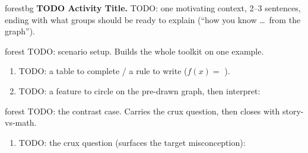 \documentclass[12pt]{article}
\newcommand{\answerspace}[2]{\par\nopagebreak\noindent\begin{minipage}[t][#1][t]{\linewidth}%
  \color{keyred}\bfseries #2\end{minipage}\par}
\begin{document}

\vspace{0.06in}

\begin{headlinebox}{forestbg}
\textbf{TODO Activity Title.} TODO: one motivating context, 2--3 sentences, ending with what
groups should be ready to explain (``how you know \dots\ from the graph'').
\end{headlinebox}

\vspace{0.04in}

\begin{scenariobox}{forest}
TODO: scenario setup. Builds the whole toolkit on one example.
\begin{enumerate}[label=\textbf{\alph*.}, leftmargin=1.8em, itemsep=8pt]
  \item TODO: a table to complete / a rule to write ($f(x) = $ \blank{3.4cm}).
  \item TODO: a feature to circle on the pre-drawn graph, then interpret:
        \answerspace{2.0cm}{}
\end{enumerate}
\end{scenariobox}

\boxguard[16]
\begin{scenariobox}{forest}
TODO: the contrast case. Carries the crux question, then closes with story-vs-math.
\begin{enumerate}[label=\textbf{\alph*.}, leftmargin=1.8em, itemsep=8pt]
  \item TODO: the crux question (surfaces the target misconception):
        \answerspace{2.6cm}{}
\end{enumerate}
\end{scenariobox}
\end{document}
